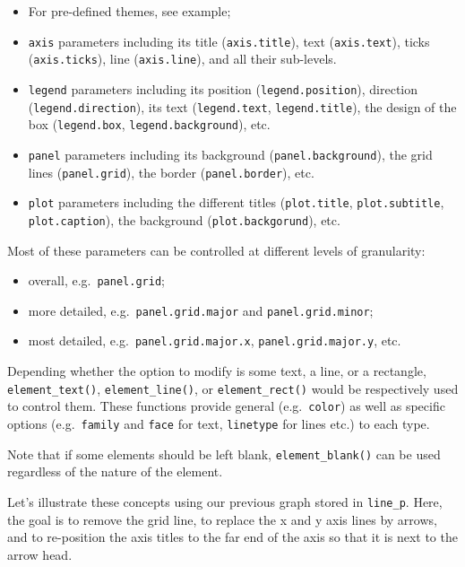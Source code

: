 \documentclass[
]{krantz}
\providecommand{\tightlist}{%
  \setlength{\itemsep}{0pt}\setlength{\parskip}{0pt}}
\begin{document}
\begin{itemize}
\tightlist
\item
  For pre-defined themes, see example;
\item
  \texttt{axis} parameters including its title (\texttt{axis.title}), text (\texttt{axis.text}), ticks (\texttt{axis.ticks}), line (\texttt{axis.line}), and all their sub-levels.
\item
  \texttt{legend} parameters including its position (\texttt{legend.position}), direction (\texttt{legend.direction}), its text (\texttt{legend.text}, \texttt{legend.title}), the design of the box (\texttt{legend.box}, \texttt{legend.background}), etc.
\item
  \texttt{panel} parameters including its background (\texttt{panel.background}), the grid lines (\texttt{panel.grid}), the border (\texttt{panel.border}), etc.
\item
  \texttt{plot} parameters including the different titles (\texttt{plot.title}, \texttt{plot.subtitle}, \texttt{plot.caption}), the background (\texttt{plot.backgorund}), etc.
\end{itemize}

Most of these parameters can be controlled at different levels of granularity:

\begin{itemize}
\tightlist
\item
  overall, e.g.~\texttt{panel.grid};
\item
  more detailed, e.g.~\texttt{panel.grid.major} and \texttt{panel.grid.minor};
\item
  most detailed, e.g.~\texttt{panel.grid.major.x}, \texttt{panel.grid.major.y}, etc.
\end{itemize}

Depending whether the option to modify is some text, a line, or a rectangle, \texttt{element\_text()}, \texttt{element\_line()}, or \texttt{element\_rect()} would be respectively used to control them. These functions provide general (e.g.~\texttt{color}) as well as specific options (e.g.~\texttt{family} and \texttt{face} for text, \texttt{linetype} for lines etc.) to each type.

Note that if some elements should be left blank, \texttt{element\_blank()} can be used regardless of the nature of the element.

Let's illustrate these concepts using our previous graph stored in \texttt{line\_p}. Here, the goal is to remove the grid line, to replace the x and y axis lines by arrows, and to re-position the axis titles to the far end of the axis so that it is next to the arrow head.
\end{document}
